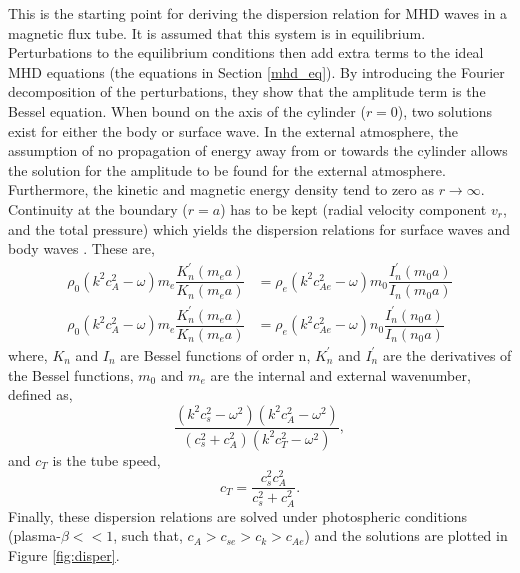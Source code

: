     This is the starting point for deriving the dispersion relation for MHD waves in a magnetic flux tube.
    It is assumed that this system is in equilibrium.
    Perturbations to the equilibrium conditions then add extra terms to the ideal MHD equations (the equations in Section \ref{mhd_eq}).
    By introducing the Fourier decomposition of the perturbations, they show that the amplitude term is the Bessel equation.
    When bound on the axis of the cylinder ($r=0$), two solutions exist for either the body or surface wave.
    In the external atmosphere, the assumption of no propagation of energy away from or towards the cylinder allows the solution for the amplitude to be found for the external atmosphere.
    Furthermore, the kinetic and magnetic energy density tend to zero as $r\rightarrow\infty$.
    Continuity at the boundary ($r=a$) has to be kept (radial velocity component $v_r$, and the total pressure) which yields the dispersion relations for surface waves and body waves \citep{WPMC}.
    These are,
    \begin{align}
        \rho_0 (k^2 c_A^2 - \omega)m_e \dfrac{K_n^\prime(m_e a)}{K_n(m_e a)} &= \rho_e (k^2 c_{Ae}^2 - \omega)m_0 \dfrac{I_n^\prime(m_0 a)}{I_n(m_0 a)} \tag{Surface, m$_0^2 > 0$} \\
        \rho_0 (k^2 c_A^2 - \omega)m_e \dfrac{K_n^\prime(m_e a)}{K_n(m_e a)} &= \rho_e (k^2 c_{Ae}^2 - \omega)n_0 \dfrac{I_n^\prime(n_0 a)}{I_n(n_0 a)} \tag{Body, m$_0^2 = -n_0 < 0$} 
    \end{align}
    where, $K_n$ and $I_n$ are Bessel functions of order n, $K_n^\prime$ and $I_n^\prime$ are the derivatives of the Bessel functions, $m_0$ and $m_e$ are the internal and external wavenumber, defined as, $$\dfrac{(k^2 c_{s}^2 - \omega^2)(k^2 c_{A}^2 - \omega^2)}{(c_{s}^2 + c_{A}^2)(k^2 c_{T}^2 - \omega^2)},$$ and $c_{T}$ is the tube speed, $$c_{T} = \dfrac{c_s^2 c_A^2}{c_s^2 + c_A^2}.$$
    Finally, these dispersion relations are solved under photospheric conditions (plasma-$\beta << 1$, such that, $c_A > c_{se} > c_k > c_{Ae} $) and the solutions are plotted in Figure \ref{fig:disper}.

